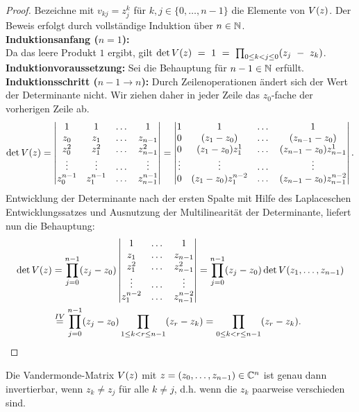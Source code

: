 \begin{proof}
    Bezeichne mit $v_{kj} = z_j^k$ für $k,j \in \{0, \dots, n-1\}$ die Elemente von $V \! \left( z \right)$.
    Der Beweis erfolgt durch vollständige Induktion über $n \in \mathbb{N}$.\\
    \textbf{Induktionsanfang (\boldmath $n=1$):}\\
    Da das leere Produkt $1$ ergibt, gilt
    $\det{V \! \left( z \right)}~=~1~=~\prod_{0 \leq k < j \leq 0} (z_j~-~z_k)$. \\[0.5em]
    \textbf{Induktionvoraussetzung:}
    Sei die Behauptung für $n-1 \in \mathbb{N}$ erfüllt.\\[0.5em]
    \textbf{Induktionsschritt (\boldmath $n\!-\!1 \rightarrow n$):}
    Durch Zeilenoperationen ändert sich der Wert der Determinante nicht.
    Wir ziehen daher in jeder Zeile das $z_0$-fache der vorherigen Zeile ab.
    \[
        \det{V \! \left( z \right)}
        = \begin{vmatrix}
            1         & 1         & \dots & 1 \\
            z_0       & z_1       & \dots & z_{n-1} \\
            z_0^2     & z_1^2     & \dots & z_{n-1}^2 \\
            \vdots    & \vdots    & \dots & \vdots \\
            z_0^{n-1} & z_1^{n-1} & \dots & z_{n-1}^{n-1}
        \end{vmatrix}
        = \begin{vmatrix}
            1      & 1                  & \dots & 1 \\
            0      & (z_1-z_0)          & \dots & (z_{n-1}-z_0) \\
            0      & (z_1-z_0)z_1^1     & \dots & (z_{n-1}-z_0) z_{n-1}^1 \\
            \vdots & \vdots             & \dots & \vdots \\
            0      & (z_1-z_0)z_1^{n-2} & \dots & (z_{n-1}-z_0) z_{n-1}^{n-2}
        \end{vmatrix}.
    \]
    Entwicklung der Determinante nach der ersten Spalte mit Hilfe des
    Laplaceschen Entwicklungssatzes und Ausnutzung der Multilinearität der
    Determinante, liefert nun die Behauptung:
    \[
        \begin{split}
            \det{V \! \left( z \right)}
            &= \prod_{j=0}^{n-1} (z_j - z_0) \begin{vmatrix}
                1         & \dots & 1 \\
                z_1       & \dots & z_{n-1} \\
                z_1^2     & \dots & z_{n-1}^2 \\
                \vdots    & \dots & \vdots \\
                z_1^{n-2} & \dots & z_{n-1}^{n-2}
            \end{vmatrix}
            = \prod_{j=0}^{n-1} (z_j - z_0) \det{V \! \left( z_1, \dots, z_{n-1} \right)}\\
            &\overset{IV}{=} \prod_{j=0}^{n-1} (z_j - z_0) \prod_{1 \leq k < r \leq n-1} (z_r - z_k)
            = \prod_{0 \leq k < r \leq n-1} (z_r - z_k).
        \end{split}
    \]
\end{proof}

\begin{corollary}
    Die Vandermonde-Matrix $V \! \left( z \right)$ mit
    $z = (z_0, \dots, z_{n-1}) \in \mathbb{C}^n$ ist genau dann invertierbar, wenn
    $z_k \neq z_j$ für alle $k \neq j$, d.h. wenn die $z_k$ paarweise
    verschieden sind.
\end{corollary}
